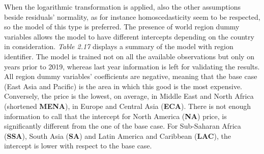 \documentclass{book}
\begin{document}
When the logarithmic transformation is applied, also the other assumptions beside residuals' normality, as for instance homoscedasticity seem to be respected, so the model of this type is preferred. The presence of world region dummy variables allows the model to have different intercepts depending on the country in consideration. \textit{Table 2.17} displays a summary of the model with region identifier. The model is trained not on all the available observations but only on years prior to 2019, whereas last year information is left for validating the results.\\

All region dummy variables' coefficients are negative, meaning that the base case (East Asia and Pacific) is the area in which this good is the most expensive. Conversely, the price is the lowest, on average, in Middle East and North Africa (shortened \textbf{MENA}), in Europe and Central Asia (\textbf{ECA}). There is not enough information to call that the intercept for North America (\textbf{NA}) price, is significantly different from the one of the base case. For Sub-Saharan Africa (\textbf{SSA}), South Asia (\textbf{SA}) and Latin America and Caribbean (\textbf{LAC}), the intercept is lower with respect to the base case.
\end{document}
